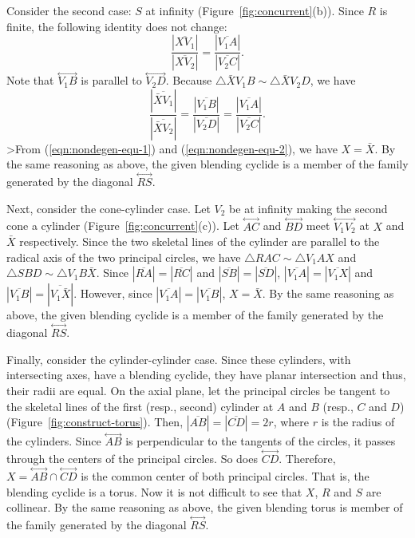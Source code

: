      Consider the second case: $S$ at infinity
(Figure~\ref{fig:concurrent}(b)).  Since $R$ is finite,
the following identity does not change:
\begin{equation}
\label{eqn:nondegen-equ-1}
   \frac{|\overline{XV_1}|}{|\overline{XV_2}|} =
   \frac{|\overline{V_1A}|}{|\overline{V_2C}|}.
\end{equation}
Note that $\stackrel{\longleftrightarrow}{V_1B}$ is parallel to
$\stackrel{\longleftrightarrow}{V_2D}$.  Because $\bigtriangleup \bar{X}V_1B
\sim\bigtriangleup \bar{X}V_2D$, we have
\begin{equation}
\label{eqn:nondegen-equ-2}
   \frac{|\overline{\bar{X}V_1}|}{|\overline{\bar{X}V_2}|} =
     \frac{|\overline{V_1B}|}{|\overline{V_2D}|}=
     \frac{|\overline{V_1A}|}{|\overline{V_2C}|}.
\end{equation}
>From (\ref{eqn:nondegen-equ-1}) and (\ref{eqn:nondegen-equ-2}), we have 
$X=\bar{X}$.  By the same reasoning as above,  the
given blending cyclide is a member of the family generated by the diagonal
$\stackrel{\longleftrightarrow}{RS}$.

     Next, consider the cone-cylinder case.  Let $V_2$ be at infinity
making the second cone a cylinder (Figure~\ref{fig:concurrent}(c)).  Let 
$\stackrel{\longleftrightarrow}{AC}$ and $\stackrel{\longleftrightarrow}{BD}$
meet $\stackrel{\longleftrightarrow}{V_1V_2}$ at $X$ and $\bar{X}$ 
respectively.  Since the two skeletal lines of the cylinder are parallel to the
radical axis of the two principal circles, we have
$\bigtriangleup RAC\sim\bigtriangleup V_1AX$ and
$\bigtriangleup SBD\sim\bigtriangleup V_1B\bar{X}$.  
Since $|\overline{RA}|=|\overline{RC}|$ and $|\overline{SB}|=|\overline{SD}|$,
$|\overline{V_1A}|=|\overline{V_1X}|$ and 
$|\overline{V_1B}|=|\overline{V_1\bar{X}}|$.  However, since
$|\overline{V_1A}|=|\overline{V_1B}|$, $X=\bar{X}$.  By the same reasoning
as above, the given blending cyclide is a member of the 
family generated by the diagonal $\stackrel{\longleftrightarrow}{RS}$.

     Finally, consider the cylinder-cylinder case.  Since these cylinders,
with intersecting axes, have a blending cyclide, they have planar intersection
and thus, their radii are equal.  On the axial plane, let the principal
circles be tangent to the skeletal lines of the first (resp., second)
cylinder at $A$ and $B$ (resp., $C$ and $D$) 
(Figure~\ref{fig:construct-torus}).  
Then, $|\overline{AB}|=|\overline{CD}|=2r$, where $r$ is the radius of the
cylinders.  Since
$\stackrel{\longleftrightarrow}{AB}$ is perpendicular to the tangents of the
circles, it passes through the centers of the principal circles.  So does
$\stackrel{\longleftrightarrow}{CD}$.  Therefore,
$X=\stackrel{\longleftrightarrow}{AB}\cap
\stackrel{\longleftrightarrow}{CD}$ is the common center of both principal
circles.  That is, the blending cyclide is a torus.  Now it is not
difficult to see that $X$, $R$ and $S$ are collinear.  By the same
reasoning as above, the given blending torus is member of the family generated
by the diagonal $\stackrel{\longleftrightarrow}{RS}$.  \QED

